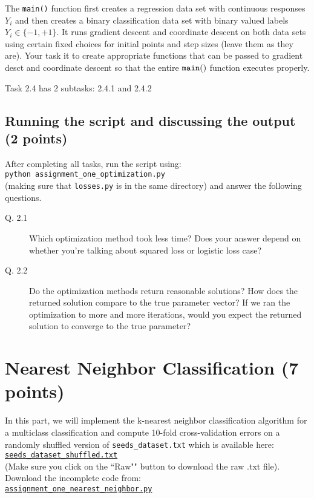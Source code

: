 \documentclass{article}
\begin{document}
The {\tt main()} function first creates a regression data set with continuous responses $Y_i$ and then creates a binary classification data set with
binary valued labels $Y_i \in \{-1,+1\}$. It runs gradient descent and coordinate descent on both data sets using certain fixed choices for initial
points and step sizes (leave them as they are). Your task it to create appropriate functions that can be passed to gradient desct and coordinate
descent so that the entire ${\tt main()}$ function executes properly.

Task 2.4 has 2 subtasks: 2.4.1 and 2.4.2

\subsection{Running the script and discussing the output (2 points)}

After completing all tasks, run the script using:\\
{\tt python assignment\_one\_optimization.py} \\
(making sure that {\tt losses.py} is in the same directory) and answer the following questions.

\begin{description}
\item[Q. 2.1]
Which optimization method took less time? Does your answer depend on whether you're talking about squared loss or logistic loss case?
\item[Q. 2.2]
Do the optimization methods return reasonable solutions? How does the returned solution compare to the true parameter vector?
If we ran the optimization to more and more iterations, would you expect the returned solution to converge to the true parameter?
\end{description}


\section{Nearest Neighbor Classification (7 points)}

In this part, we will implement the k-nearest neighbor classification algorithm for a multiclass classification and compute 10-fold cross-validation
errors on a randomly shuffled version of {\tt seeds\_dataset.txt} which is available here:\\
\href{https://github.com/ambujtewari/stats607a-fall2015/blob/master/homeworks/datasets/seeds_dataset_shuffled.txt}{\tt seeds\_dataset\_shuffled.txt} \\
(Make sure you click on the ``Raw"" button to download the raw .txt file).
Download the incomplete code from:\\
\href{https://github.com/ambujtewari/stats607a-fall2015/blob/master/homeworks/assignment_one_nearest_neighbor.py}{\tt assignment\_one\_nearest\_neighbor.py}
\end{document}
